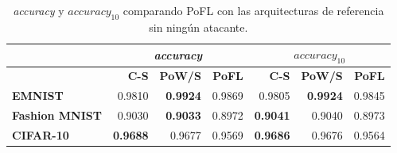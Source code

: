 \begin{table}[!ht]
\centering
\begin{tabular}{lrrrrrr}
\toprule
 & \multicolumn{3}{c}{\textit{accuracy}} & \multicolumn{3}{c}{\textit{$accuracy_{10}$}}   \\
\toprule
       & \textbf{C-S} & \textbf{PoW/S} & \textbf{PoFL} & \textbf{C-S} & \textbf{PoW/S} & \textbf{PoFL}  \\ 
\toprule
\textbf{EMNIST} & 0.9810& \textbf{0.9924}& 0.9869& 0.9805& \textbf{0.9924}& 0.9845\\  
\midrule
\textbf{Fashion MNIST}& 0.9030& \textbf{0.9033}& 0.8972& \textbf{0.9041}& 0.9040& 0.8973\\ 
\midrule
\textbf{CIFAR-10}        & \textbf{0.9688}& 0.9677& 0.9569& \textbf{0.9686}& 0.9676& 0.9564\\
\bottomrule
\end{tabular}
\caption{\textit{accuracy} y \textit{$accuracy_{10}$} comparando PoFL con las arquitecturas de referencia sin ningún atacante.}\label{tab:baseline_pofl}

\end{table}
